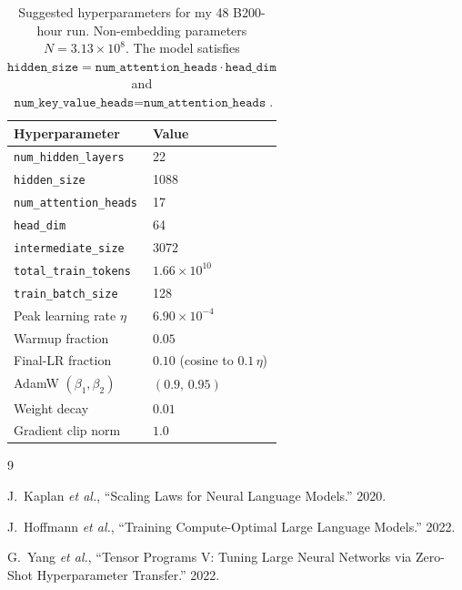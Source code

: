 \documentclass[11pt]{article}
\begin{document}
\begin{table}[H]
    \centering
    \begin{tabular}{ll}
        \toprule
        Hyperparameter & Value \\
        \midrule
        \texttt{num\_hidden\_layers}   & 22 \\
        \texttt{hidden\_size}          & 1088 \\
        \texttt{num\_attention\_heads} & 17 \\
        \texttt{head\_dim}             & 64 \\
        \texttt{intermediate\_size}    & 3072 \\
        \texttt{total\_train\_tokens}  & $1.66 \times 10^{10}$  \\
        \texttt{train\_batch\_size}    & 128 \\
        Peak learning rate $\eta$      & $6.90 \times 10^{-4}$ \\
        Warmup fraction                & $0.05$ \\
        Final-LR fraction              & $0.10$ (cosine to $0.1\,\eta$) \\
        AdamW $(\beta_1, \beta_2)$     & $(0.9,\, 0.95)$ \\
        Weight decay                   & $0.01$ \\
        Gradient clip norm             & $1.0$ \\
        \bottomrule
    \end{tabular}
    \caption{Suggested hyperparameters for my 48 B200-hour run. Non-embedding parameters $N = 3.13 \times 10^{8}$. The model satisfies $\texttt{hidden\_size} = \texttt{num\_attention\_heads} \cdot \texttt{head\_dim}$ and $\texttt{num\_key\_value\_heads} = \texttt{num\_attention\_heads}$.}
    \label{tab:hyperparameters}
\end{table}


\begin{thebibliography}{9}

J.\ Kaplan \textit{et al.}, ``Scaling Laws for Neural Language Models.'' 2020.

J.\ Hoffmann \textit{et al.}, ``Training Compute-Optimal Large Language Models.'' 2022.

G.\ Yang \textit{et al.}, ``Tensor Programs V: Tuning Large Neural Networks via Zero-Shot Hyperparameter Transfer.'' 2022.

\end{thebibliography}
\end{document}

